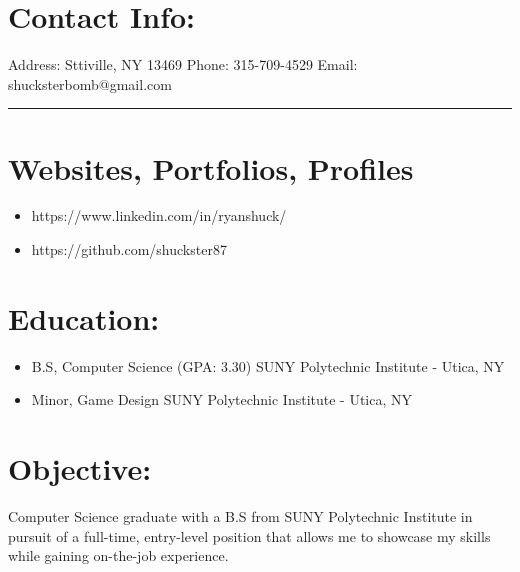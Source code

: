 \documentclass[12pt, oneside, a4paper]{article}
\begin{document}
  

    \section*{Contact Info:}
    Address: Sttiville, NY 13469
    \newline
    Phone: 315-709-4529
    \newline
    Email: shucksterbomb@gmail.com
    \newline

    \noindent
    {\color{blue} \rule{\linewidth}{1mm}}

    \section*{Websites, Portfolios, Profiles}
    \begin{itemize}
    \scriptsize
        \item https://www.linkedin.com/in/ryanshuck/
        \item https://github.com/shuckster87
    \end{itemize}

    \section*{Education:}
    \begin{itemize}
    \scriptsize
    \item B.S, Computer Science  (GPA: 3.30)
    SUNY Polytechnic Institute - Utica, NY
    \item Minor, Game Design
    SUNY Polytechnic Institute - Utica, NY
    \end{itemize}

    \section*{Objective:}
    Computer Science graduate with a B.S from SUNY Polytechnic Institute in pursuit of a full-time, entry-level position that allows me to showcase my skills while gaining on-the-job experience.
\end{document}
